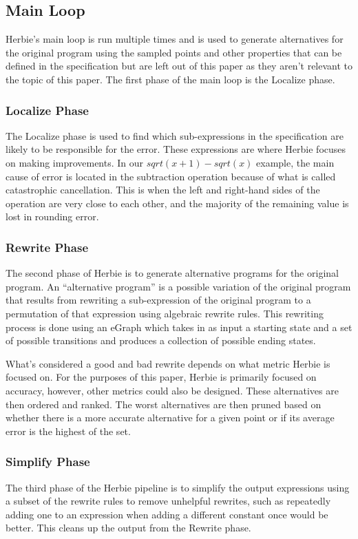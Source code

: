 \documentclass{article}
\begin{document}
\subsection{Main Loop}
Herbie’s main loop is run multiple times and is used to generate alternatives for the original program using the sampled points and other properties that can be defined in the specification but are left out of this paper as they aren’t relevant to the topic of this paper. The first phase of the main loop is the Localize phase.

\subsubsection{Localize Phase}

The Localize phase is used to find which sub-expressions in the specification are likely to be responsible for the error. These expressions are where Herbie focuses on making improvements. In our \newline $sqrt(x + 1) - sqrt(x)$ example, the main cause of error is located in the subtraction operation because of what is called catastrophic cancellation. This is when the left and right-hand sides of the operation are very close to each other, and the majority of the remaining value is lost in rounding error. 

\subsubsection{Rewrite Phase}

The second phase of Herbie is to generate alternative programs for the original program. An “alternative program” is a possible variation of the original program that results from rewriting a sub-expression of the original program to a permutation of that expression using algebraic rewrite rules. This rewriting process is done using an eGraph\cite{eGraphs} which takes in as input a starting state and a set of possible transitions and produces a collection of possible ending states.

What’s considered a good and bad rewrite depends on what metric Herbie is focused on. For the purposes of this paper, Herbie is primarily focused on accuracy, however, other metrics could also be designed. These alternatives are then ordered and ranked. The worst alternatives are then pruned based on whether there is a more accurate alternative for a given point or if its average error is the highest of the set.

\subsubsection{Simplify Phase}
The third phase of the Herbie pipeline is to simplify the output expressions using a subset of the rewrite rules to remove unhelpful rewrites, such as repeatedly adding one to an expression when adding a different constant once would be better. This cleans up the output from the Rewrite phase.
\end{document}
